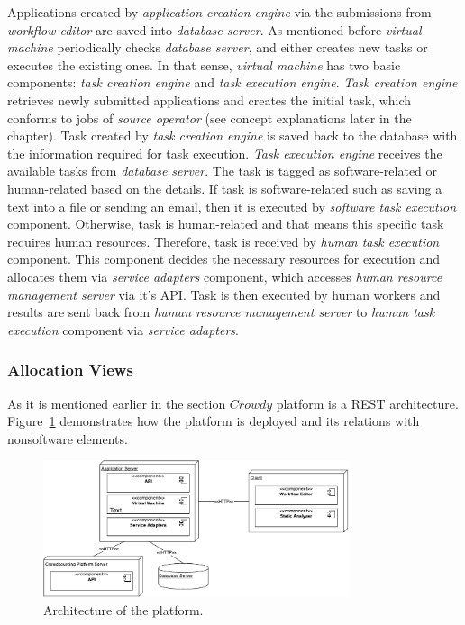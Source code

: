 Applications created by \textit{application creation engine} via the submissions from 
\textit{workflow editor} are saved into \textit{database server}. As mentioned before 
\textit{virtual machine} periodically checks \textit{database server}, and either 
creates new tasks or executes the existing ones. In that sense, \textit{virtual machine} 
has two basic components: \textit{task creation engine} and 
\textit{task execution engine}. \textit{Task creation engine} retrieves newly submitted 
applications and creates the initial task, which conforms to jobs of 
\textit{source operator} (see concept explanations later in the chapter). Task created 
by \textit{task creation engine} is saved back to the database with the information 
required for task execution. \textit{Task execution engine} receives the available 
tasks from \textit{database server}. The task is tagged as software-related or 
human-related based on the details. If task is software-related such as saving 
a text into a file or sending an email, then it is executed by 
\textit{software task execution} component. Otherwise, task is human-related and 
that means this specific task requires human resources. Therefore, task 
is received by \textit{human task execution} component. This component decides 
the necessary resources for execution and allocates them via \textit{service adapters} 
component, which accesses \textit{human resource management server} via it's API. 
Task is then executed by human workers and results are sent back from 
\textit{human resource management server} to \textit{human task execution} 
component via \textit{service adapters}.


\subsubsection{Allocation Views}
As it is mentioned earlier in the section $Crowdy$ platform is a REST architecture. 
Figure~\ref{fig:archdeployment} demonstrates how the platform is deployed and its 
relations with nonsoftware elements.

\begin{figure}[ht]
	\centering
	\includegraphics[width=0.8\textwidth]{figures/architecture/Deployment.pdf}
	\caption{Architecture of the platform.}
	\label{fig:archdeployment}
\end{figure}

